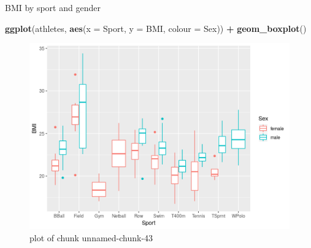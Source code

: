 \documentclass[ignorenonframetext,]{beamer}
\newenvironment{Shaded}{\begin{snugshade}}{\end{snugshade}}
\newcommand{\DataTypeTok}[1]{\textcolor[rgb]{0.13,0.29,0.53}{#1}}
\newcommand{\KeywordTok}[1]{\textcolor[rgb]{0.13,0.29,0.53}{\textbf{#1}}}
\newcommand{\NormalTok}[1]{#1}
\newcommand{\OperatorTok}[1]{\textcolor[rgb]{0.81,0.36,0.00}{\textbf{#1}}}
\newcommand{\StringTok}[1]{\textcolor[rgb]{0.31,0.60,0.02}{#1}}
\begin{document}
\begin{frame}[fragile]{BMI by sport and gender}
\protect\hypertarget{bmi-by-sport-and-gender}{}

\begin{Shaded}
\begin{Highlighting}[]
\KeywordTok{ggplot}\NormalTok{(athletes, }\KeywordTok{aes}\NormalTok{(}\DataTypeTok{x =}\NormalTok{ Sport, }\DataTypeTok{y =}\NormalTok{ BMI, }\DataTypeTok{colour =}\NormalTok{ Sex)) }\OperatorTok{+}
\StringTok{  }\KeywordTok{geom_boxplot}\NormalTok{()}
\end{Highlighting}
\end{Shaded}

\begin{figure}
\centering
\includegraphics{figure/unnamed-chunk-43-1.png}
\caption{plot of chunk unnamed-chunk-43}
\end{figure}

\end{frame}
\end{document}
